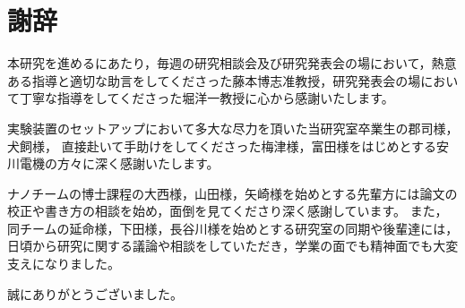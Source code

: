 \documentclass[fleqn]{jreport}
\begin{document}
\chapter*{謝辞}
本研究を進めるにあたり，毎週の研究相談会及び研究発表会の場において，熱意ある指導と適切な助言をしてくださった藤本博志准教授，研究発表会の場において丁寧な指導をしてくださった堀洋一教授に心から感謝いたします。

実験装置のセットアップにおいて多大な尽力を頂いた当研究室卒業生の郡司様，犬飼様，
直接赴いて手助けをしてくださった梅津様，富田様をはじめとする安川電機の方々に深く感謝いたします。

ナノチームの博士課程の大西様，山田様，矢崎様を始めとする先輩方には論文の校正や書き方の相談を始め，面倒を見てくださり深く感謝しています。
また，同チームの延命様，下田様，長谷川様を始めとする研究室の同期や後輩達には，日頃から研究に関する議論や相談をしていただき，学業の面でも精神面でも大変支えになりました。

誠にありがとうございました。
\end{document}
